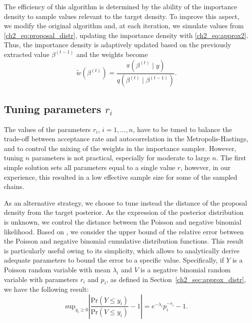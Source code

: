 The efficiency of this algorithm is determined by the ability of the importance density to sample values relevant to the target density.
To improve this aspect, we modify the original algorithm and, at each iteration, we simulate values from \eqref{ch2_eq:proposal_distr}, updating the importance density with \eqref{ch2_eq:approx2}. Thus, the importance density is adaptively updated based on the previously extracted value $\beta^{(t-1)}$ and the weights become
\begin{equation*}
\tilde{w}(\beta^{(t)}) = \frac{\pi(\beta^{(t)} \mid y)}{q(\beta^{(t)} \mid \beta^{(t-1)})}.
\end{equation*}


\subsection{Tuning parameters $r_i$}
\label{sec:tuning_param}

The values of the parameters $r_i$, $i=1,\dots,n$, have to be tuned to balance the trade-off between acceptance rate and autocorrelation in the Metropolis-Hastings, and to control the mixing of the weights in the importance sampler. However, tuning $n$ parameters is not practical, especially for moderate to large $n$.
The first simple solution sets all  parameters equal to a single value $r$, however, in our experience, this resulted in a low effective sample size for some of the sampled chains.

As an alternative strategy, we choose to tune instead the distance of the proposal density from the target posterior.
As the expression of the posterior distribution is unknown, we control the distance between the Poisson and negative binomial likelihood. %
Based on \citet{Teerapabolarn2012}, we consider the upper bound of the relative error between the Poisson and negative binomial cumulative distribution functions. This result is particularly useful owing to its simplicity, which allows to analytically derive adequate parameters to bound the error to a specific value. Specifically, if $Y$ is a Poisson random variable with mean $\lambda_i$ and $V$ is a negative binomial random variable with parameters $r_i$ and $p_i$, as defined in Section~\ref{ch2_sec:approx_distr}, we have the following result:
\begin{equation*}
\mathrm{sup}_{y_i\geq 0} \left\lvert \frac{\mbox{Pr}(Y\leq y_i)}{\mbox{Pr}(V\leq y_i)} -1 \right\rvert = e^{-\lambda_i} p_i^{-r_i} - 1.
\end{equation*}

